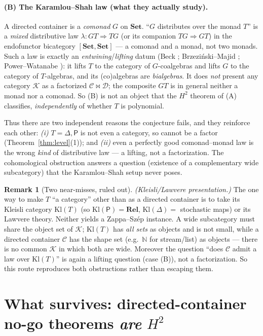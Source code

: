 \documentclass[11pt]{article}
\theoremstyle{definition}
\newtheorem{remark}[theorem]{Remark}
\newcommand{\C}{\mathcal{C}}
\newcommand{\D}{\mathcal{D}}
\newcommand{\K}{\mathcal{K}}
\newcommand{\Set}{\mathbf{Set}}
\newcommand{\Pow}{\mathsf{P}}
\newcommand{\Dist}{\Delta}
\begin{document}
\paragraph{(B) The Karamlou--Shah law (what they actually study).} A directed
container is a \emph{comonad} $G$ on $\Set$. ``$G$ distributes over the monad $T$''
is a \emph{mixed} distributive law $\lambda\colon GT\Rightarrow TG$ (or its
companion $TG\Rightarrow GT$) in the endofunctor bicategory $[\Set,\Set]$ --- a
comonad and a monad, not two monads. Such a law is exactly an
\emph{entwining}/\emph{lifting} datum (Beck \cite{beck}; Brze\-zi\'nski--Majid
\cite{bm}; Power--Watanabe \cite{pw}): it lifts $T$ to the category of
$G$-coalgebras and lifts $G$ to the category of $T$-algebras, and its (co)algebras
are \emph{bialgebras}. It does \emph{not} present any category $\K$ as a factorized
$\C\bowtie\D$; the composite $GT$ is in general neither a monad nor a comonad. So
(B) is not an object that the $H^2$ theorem of (A) classifies, \emph{independently}
of whether $T$ is polynomial.
\smallskip

Thus there are two independent reasons the conjecture fails, and they reinforce each
other: \emph{(i)} $T=\Dist,\Pow$ is not even a category, so cannot be a factor
(Theorem~\ref{thm:level}(1)); and \emph{(ii)} even a perfectly good comonad--monad
law is the wrong \emph{kind} of distributive law --- a lifting, not a factorization.
The cohomological obstruction answers a question (existence of a complementary wide
subcategory) that the Karamlou--Shah setup never poses.

\begin{remark}[Two near-misses, ruled out]
\emph{(Kleisli/Lawvere presentation.)} The one way to make $T$ ``a category'' other
than as a directed container is to take its Kleisli category $\mathrm{Kl}(T)$ (so
$\mathrm{Kl}(\Pow)=\mathbf{Rel}$, $\mathrm{Kl}(\Dist)=$ stochastic maps) or its
Lawvere theory. Neither yields a Zappa--Sz\'ep instance. A wide subcategory must
share the object set of $\K$; $\mathrm{Kl}(T)$ has \emph{all sets} as objects and is
not small, while a directed container $\C$ has the shape set (e.g.\ $\mathbb N$ for
stream/list) as objects --- there is no common $\K$ in which both are wide.
Moreover the question ``does $\C$ admit a law over $\mathrm{Kl}(T)$'' is again a
lifting question (case (B)), not a factorization. So this route reproduces both
obstructions rather than escaping them.
\end{remark}

\section{What survives: directed-container no-go theorems \emph{are} $H^2$}
\label{sec:positive}
\end{document}
